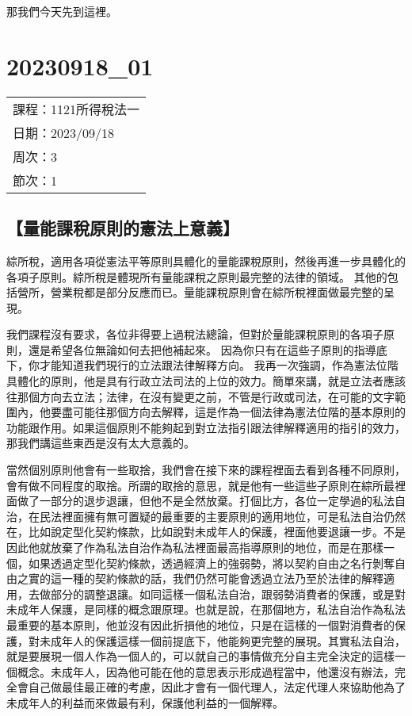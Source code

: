 \documentclass[]{ctexbook}
\begin{document}
那我們今天先到這裡。

\hypertarget{section-5}{%
\chapter{20230918\_01}\label{section-5}}

\begin{longtable}[]{@{}l@{}}
\toprule()
\endhead
課程：1121所得稅法一 \\
日期：2023/09/18 \\
周次：3 \\
節次：1 \\
\bottomrule()
\end{longtable}

\hypertarget{ux91cfux80fdux8ab2ux7a05ux539fux5247ux7684ux61b2ux6cd5ux4e0aux610fux7fa9}{%
\section{【量能課稅原則的憲法上意義】}\label{ux91cfux80fdux8ab2ux7a05ux539fux5247ux7684ux61b2ux6cd5ux4e0aux610fux7fa9}}

綜所稅，適用各項從憲法平等原則具體化的量能課稅原則，然後再進一步具體化的各項子原則。綜所稅是體現所有量能課稅之原則最完整的法律的領域。
其他的包括營所，營業稅都是部分反應而已。量能課稅原則會在綜所稅裡面做最完整的呈現。

我們課程沒有要求，各位非得要上過稅法總論，但對於量能課稅原則的各項子原則，還是希望各位無論如何去把他補起來。
因為你只有在這些子原則的指導底下，你才能知道我們現行的立法跟法律解釋方向。
我再一次強調，作為憲法位階具體化的原則，他是具有行政立法司法的上位的效力。簡單來講，就是立法者應該往那個方向去立法；法律，在沒有變更之前，不管是行政或司法，在可能的文字範圍內，他要盡可能往那個方向去解釋，這是作為一個法律為憲法位階的基本原則的功能跟作用。如果這個原則不能夠起到對立法指引跟法律解釋適用的指引的效力，那我們講這些東西是沒有太大意義的。

當然個別原則他會有一些取捨，我們會在接下來的課程裡面去看到各種不同原則，會有做不同程度的取捨。所謂的取捨的意思，就是他有一些這些子原則在綜所最裡面做了一部分的退步退讓，但他不是全然放棄。打個比方，各位一定學過的私法自治，在民法裡面擁有無可置疑的最重要的主要原則的適用地位，可是私法自治仍然在，比如說定型化契約條款，比如說對未成年人的保護，裡面他要退讓一步。不是因此他就放棄了作為私法自治作為私法裡面最高指導原則的地位，而是在那樣一個，如果透過定型化契約條款，透過經濟上的強弱勢，將以契約自由之名行剝奪自由之實的這一種的契約條款的話，我們仍然可能會透過立法乃至於法律的解釋適用，去做部分的調整退讓。如同這樣一個私法自治，跟弱勢消費者的保護，或是對未成年人保護，是同樣的概念跟原理。也就是說，在那個地方，私法自治作為私法最重要的基本原則，他並沒有因此折損他的地位，只是在這樣的一個對消費者的保護，對未成年人的保護這樣一個前提底下，他能夠更完整的展現。其實私法自治，就是要展現一個人作為一個人的，可以就自己的事情做充分自主完全決定的這樣一個概念。未成年人，因為他可能在他的意思表示形成過程當中，他還沒有辦法，完全會自己做最佳最正確的考慮，因此才會有一個代理人，法定代理人來協助他為了未成年人的利益而來做最有利，保護他利益的一個解釋。
\end{document}

